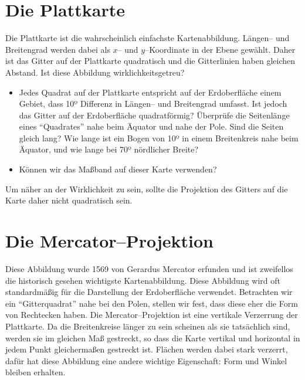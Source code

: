 \documentclass[a4paper,12pt]{article}
\begin{document}
\newpage
\section{Die Plattkarte}
\label{sec-plate}
Die Plattkarte ist die wahrscheinlich einfachste Kartenabbildung. Längen-- und 
Breitengrad werden dabei als $x$-- und $y$--Koordinate in der Ebene gewählt. 
Daher ist das Gitter auf der Plattkarte quadratisch und die Gitterlinien haben 
gleichen Abstand. Ist diese Abbildung wirklichkeitsgetreu?

\begin{itemize}
 \item Jedes Quadrat auf der Plattkarte entspricht auf der Erdoberfläche einem Gebiet, 
       dass 10º Differenz in Längen-- und Breitengrad umfasst. Ist jedoch das Gitter 
       auf der Erdoberfläche quadratförmig? Überprüfe die Seitenlänge eines "`Quadrates"'
       nahe beim Äquator und nahe der Pole. Sind die Seiten gleich lang? Wie lange ist 
       ein Bogen von 10º in einem Breitenkreis nahe beim Äquator, und wie lange bei 
       70º nördlicher Breite?
 \item Können wir das Maßband auf dieser Karte verwenden?
\end{itemize}

Um näher an der Wirklichkeit zu sein, sollte die Projektion des Gitters auf die Karte 
daher nicht quadratisch sein.



 
\newpage
\section{Die Mercator--Projektion}
\label{sec-mercator}

Diese Abbildung wurde 1569 von Gerardus Mercator erfunden und ist zweifellos die 
historisch gesehen wichtigste Kartenabbildung. Diese Abbildung wird oft standardmäßig 
für die Darstellung der Erdoberfläche verwendet. Betrachten wir ein "`Gitterquadrat"' 
nahe bei den Polen, stellen wir fest, dass diese eher die Form von Rechtecken haben. 
Die Mercator--Projektion ist eine vertikale Verzerrung der Plattkarte. Da die 
Breitenkreise länger zu sein scheinen als sie tatsächlich sind, werden sie
im gleichen Maß gestreckt, so dass die Karte vertikal und horizontal in jedem Punkt 
gleichermaßen gestreckt ist. Flächen werden dabei stark verzerrt, dafür hat diese 
Abbildung eine andere wichtige Eigenschaft: Form und Winkel bleiben erhalten.
\end{document}
